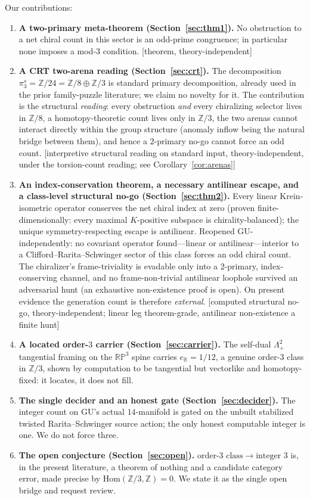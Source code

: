\documentclass[11pt]{article}
\theoremstyle{definition}
\theoremstyle{remark}
\newcommand{\Z}{\mathbb{Z}}
\newcommand{\R}{\mathbb{R}}
\newcommand{\RP}{\mathbb{RP}}
\newcommand{\pis}{\pi_3^{s}}
\newcommand{\Hom}{\mathrm{Hom}}
\newcommand{\Lamp}{\Lambda^2_{+}}
\newcommand{\eR}{e_{\R}}
\begin{document}
Our contributions:
\begin{enumerate}[leftmargin=2em]
\item \textbf{A two-primary meta-theorem (Section~\ref{sec:thm1}).} No obstruction to a net chiral count in this
sector is an odd-prime congruence; in particular none imposes a mod-$3$ condition. [theorem, theory-independent]
\item \textbf{A CRT two-arena reading (Section~\ref{sec:crt}).} The decomposition
$\pis = \Z/24 = \Z/8 \oplus \Z/3$ is standard primary decomposition, already used in the prior family-puzzle
literature; we claim no novelty for it. The contribution is the structural \emph{reading}: every obstruction
\emph{and} every chiralizing selector lives in $\Z/8$, a homotopy-theoretic count lives only in $\Z/3$, the two
arenas cannot interact directly within the group structure (anomaly inflow being the natural bridge between them), and hence a $2$-primary no-go
cannot force an odd count. [interpretive structural reading on standard input, theory-independent, under the
torsion-count reading; see Corollary~\ref{cor:arenas}]
\item \textbf{An index-conservation theorem, a necessary antilinear escape, and a class-level structural no-go
(Section~\ref{sec:thm2}).} Every linear Krein-isometric operator conserves the net chiral index at zero (proven
finite-dimensionally: every maximal $K$-positive subspace is chirality-balanced); the unique
symmetry-respecting escape is antilinear. Reopened GU-independently:
no covariant operator found---linear or antilinear---interior to a Clifford--Rarita--Schwinger sector of this
class forces an odd chiral count. The chiralizer's frame-triviality is evadable only into a $2$-primary,
index-conserving channel, and no frame-non-trivial antilinear loophole survived an adversarial hunt (an
exhaustive non-existence proof is open). On present evidence the generation count is therefore \emph{external}.
[computed structural no-go, theory-independent; linear leg theorem-grade, antilinear non-existence a finite hunt]
\item \textbf{A located order-$3$ carrier (Section~\ref{sec:carrier}).} The self-dual $\Lamp$ tangential framing
on the $\RP^3$ spine carries $\eR=1/12$, a genuine order-$3$ class in $\Z/3$, shown by computation to be
tangential but vectorlike and homotopy-fixed: it locates, it does not fill.
\item \textbf{The single decider and an honest gate (Section~\ref{sec:decider}).} The integer count on GU's
actual $14$-manifold is gated on the unbuilt stabilized twisted Rarita--Schwinger source action; the only honest
computable integer is one. We do not force three.
\item \textbf{The open conjecture (Section~\ref{sec:open}).} $\text{order-}3\text{ class}\to\text{integer }3$ is,
in the present literature, a theorem of nothing and a candidate category error, made precise by
$\Hom(\Z/3,\Z)=0$. We state it as the single open bridge and request review.
\end{enumerate}
\end{document}
